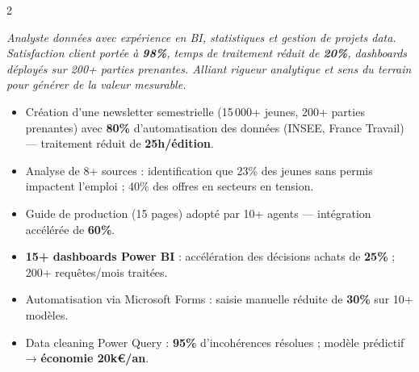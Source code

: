 \documentclass[9pt,a4paper,ragged2e,withhyper]{altacv}
\begin{document}


\makecvheader
\vspace{-6pt}


\begin{paracol}{2}


{\small\color{emphasis}\itshape
Analyste données avec expérience en BI, statistiques et gestion de projets data. Satisfaction client portée à \textbf{98\%}, temps de traitement réduit de \textbf{20\%}, dashboards déployés sur 200+ parties prenantes. Alliant rigueur analytique et sens du terrain pour générer de la valeur mesurable.}

\vspace{2pt}


\vspace{-4pt}
\begin{itemize}
  \item Création d'une newsletter semestrielle (15\,000+ jeunes, 200+ parties prenantes) avec \textbf{80\%} d'automatisation des données (INSEE, France Travail) — traitement réduit de \textbf{25h/édition}.
  \item Analyse de 8+ sources : identification que 23\% des jeunes sans permis impactent l'emploi ; 40\% des offres en secteurs en tension.
  \item Guide de production (15 pages) adopté par 10+ agents — intégration accélérée de \textbf{60\%}.
\end{itemize}

\vspace{-2pt}\divider\vspace{-2pt}

\vspace{-4pt}
\begin{itemize}
  \item \textbf{15+ dashboards Power BI} : accélération des décisions achats de \textbf{25\%} ; 200+ requêtes/mois traitées.
  \item Automatisation via Microsoft Forms : saisie manuelle réduite de \textbf{30\%} sur 10+ modèles.
  \item Data cleaning Power Query : \textbf{95\%} d'incohérences résolues ; modèle prédictif → \textbf{économie 20k€/an}.
\end{itemize}


\end{paracol}
\end{document}
